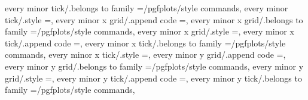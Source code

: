{{{{{{{{{every minor tick/.belongs to family                                =/pgfplots/style commands,                                                                                                          
every minor tick/.style                                            ={},                                                                                                                                
every minor x grid/.append code                                    ={},                                                                         
every minor x grid/.belongs to family                              =/pgfplots/style commands,                                                                                                          
every minor x grid/.style                                          ={},                                                                                                                                
every minor x tick/.append code                                    ={},                                                                         
every minor x tick/.belongs to family                              =/pgfplots/style commands,                                                                                                          
every minor x tick/.style                                          ={},                                                                                                                                
every minor y grid/.append code                                    ={},                                                                         
every minor y grid/.belongs to family                              =/pgfplots/style commands,                                                                                                          
every minor y grid/.style                                          ={},                                                                                                                                
every minor y tick/.append code                                    ={},                                                                         
every minor y tick/.belongs to family                              =/pgfplots/style commands,                                                                                                          
}}}}}}}}}
